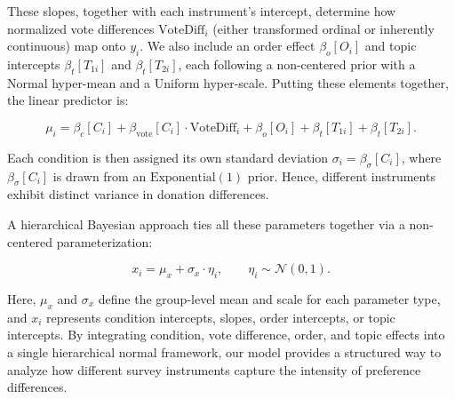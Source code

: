 These slopes, together with each instrument's intercept, determine how normalized vote differences $\text{VoteDiff}_i$ (either transformed ordinal or inherently continuous) map onto $y_i$. We also include an order effect $\beta_{o}[O_i]$ and topic intercepts $\beta_{t}[T_{1i}]$ and $\beta_{t}[T_{2i}]$, each following a non-centered prior with a Normal hyper-mean and a Uniform hyper-scale. Putting these elements together, the linear predictor is:

\begin{equation}
    \label{eq:intensity_linpred}
    \mu_i
    =
    \beta_{c}[C_i]
    +
    \beta_{\text{vote}}[C_i] \cdot \text{VoteDiff}_i
    +
    \beta_{o}[O_i]
    +
    \beta_{t}[T_{1i}]
    +
    \beta_{t}[T_{2i}].
\end{equation}

Each condition is then assigned its own standard deviation $\sigma_i=\beta_{\sigma}[C_i]$, where $\beta_{\sigma}[C_i]$ is drawn from an $\mathrm{Exponential}(1)$ prior. Hence, different instruments exhibit distinct variance in donation differences.

A hierarchical Bayesian approach ties all these parameters together via a non-centered parameterization:

\begin{equation}
    x_i
    =
    \mu_x
    + \sigma_x \cdot \eta_i,
    \qquad
    \eta_i
    \sim
    \mathcal{N}(0,1).
\end{equation}

Here, $\mu_x$ and $\sigma_x$ define the group-level mean and scale for each parameter type, and $x_i$ represents condition intercepts, slopes, order intercepts, or topic intercepts. By integrating condition, vote difference, order, and topic effects into a single hierarchical normal framework, our model provides a structured way to analyze how different survey instruments capture the intensity of preference differences.
